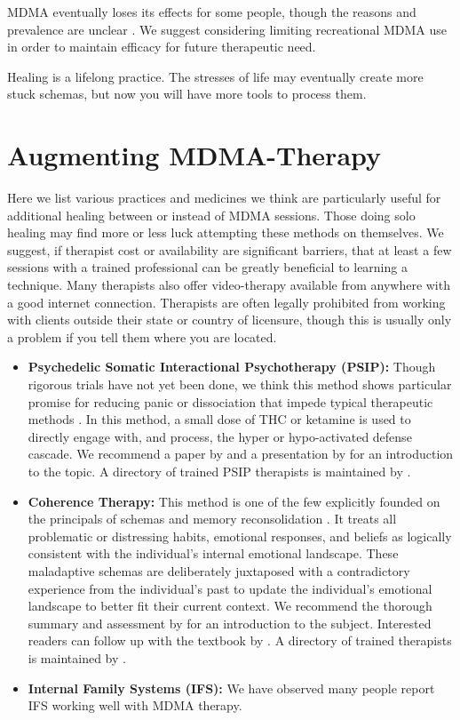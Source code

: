 \documentclass[12pt,letterpaper]{article}
\begin{document}
MDMA eventually loses its effects for some people, though the reasons and prevalence are unclear \cite{parrottTolerance}. We suggest considering limiting recreational MDMA use in order to maintain efficacy for future therapeutic need.

Healing is a lifelong practice. The stresses of life may eventually create more stuck schemas, but now you will have more tools to process them.
\section{Augmenting MDMA-Therapy}
\label{healingPractices}
Here we list various practices and medicines we think are particularly useful for additional healing between or instead of MDMA sessions. Those doing solo healing may find more or less luck attempting these methods on themselves. We suggest, if therapist cost or availability are significant barriers, that at least a few sessions with a trained professional can be greatly beneficial to learning a technique. Many therapists also offer video-therapy available from anywhere with a good internet connection. Therapists are often legally prohibited from working with clients outside their state or country of licensure, though this is usually only a problem if you tell them where you are located.
\begin{itemize}
    \item \textbf{Psychedelic Somatic Interactional Psychotherapy (PSIP):} Though rigorous trials have not yet been done, we think this method shows particular promise for reducing panic or dissociation that impede typical therapeutic methods \cite{razviPSIP,ragnhildstveit2023cannabis}. In this method, a small dose of THC or ketamine is used to directly engage with, and process, the hyper or hypo-activated defense cascade. We recommend a paper by \textcite{razviPSIP} and a presentation by \textcite{razviPresentation} for an introduction to the topic. A directory of trained PSIP therapists is maintained by \textcite{psipDirectory}.
    \item \textbf{Coherence Therapy:} This method is one of the few explicitly founded on the principals of schemas and memory reconsolidation \cite{eckerUnlocking}. It treats all problematic or distressing habits, emotional responses, and beliefs as logically consistent with the individual's internal emotional landscape. These maladaptive schemas are deliberately juxtaposed with a contradictory experience from the individual's past to update the individual's emotional landscape to better fit their current context. We recommend the thorough summary and assessment by \textcite{lesswrongCoherenceTherapy} for an introduction to the subject. Interested readers can follow up with the textbook by \textcite{eckerUnlocking}. A directory of trained therapists is maintained by \textcite{coherenceDirectory}.
    \item \textbf{Internal Family Systems (IFS):} We have observed many people report IFS working well with MDMA therapy. 
\end{itemize}
\end{document}
